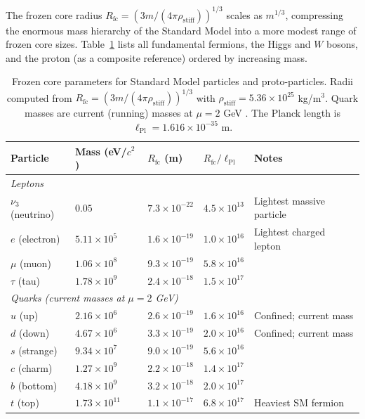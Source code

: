 \documentclass[11pt,a4paper]{article}
\newcommand{\lPl}{\ensuremath{\ell_{\mathrm{Pl}}}}
\newcommand{\rhostiff}{\ensuremath{\rho_{\mathrm{stiff}}}}
\newcommand{\Rfc}{\ensuremath{R_{\mathrm{fc}}}}
\theoremstyle{definition}
\theoremstyle{remark}
\begin{document}
The frozen core radius $\Rfc = (3m/(4\pi\rhostiff))^{1/3}$ scales as $m^{1/3}$, compressing the enormous mass hierarchy of the Standard Model into a more modest range of frozen core sizes. Table~\ref{tab:frozen_cores} lists all fundamental fermions, the Higgs and $W$ bosons, and the proton (as a composite reference) ordered by increasing mass.

\begin{table}[H]
\centering
\caption{Frozen core parameters for Standard Model particles and proto-particles. Radii computed from $\Rfc = (3m/(4\pi\rhostiff))^{1/3}$ with $\rhostiff = 5.36 \times 10^{25}$ kg/m$^3$. Quark masses are current (running) masses at $\mu = 2$ GeV \cite{PDG2024}. The Planck length is $\lPl = 1.616 \times 10^{-35}$ m.}
\label{tab:frozen_cores}
\vspace{0.5em}
\begin{tabular}{lllll}
\toprule
\textbf{Particle} & \textbf{Mass (eV/$c^2$)} & \textbf{$\Rfc$ (m)} & \textbf{$\Rfc/\lPl$} & \textbf{Notes} \\
\midrule
\multicolumn{5}{l}{\textit{Leptons}} \\
$\nu_3$ (neutrino) & $0.05$ & $7.3 \times 10^{-22}$ & $4.5 \times 10^{13}$ & Lightest massive particle \\
$e$ (electron) & $5.11 \times 10^5$ & $1.6 \times 10^{-19}$ & $1.0 \times 10^{16}$ & Lightest charged lepton \\
$\mu$ (muon) & $1.06 \times 10^8$ & $9.3 \times 10^{-19}$ & $5.8 \times 10^{16}$ & \\
$\tau$ (tau) & $1.78 \times 10^9$ & $2.4 \times 10^{-18}$ & $1.5 \times 10^{17}$ & \\
\midrule
\multicolumn{5}{l}{\textit{Quarks (current masses at $\mu = 2$ GeV)}} \\
$u$ (up) & $2.16 \times 10^6$ & $2.6 \times 10^{-19}$ & $1.6 \times 10^{16}$ & Confined; current mass \\
$d$ (down) & $4.67 \times 10^6$ & $3.3 \times 10^{-19}$ & $2.0 \times 10^{16}$ & Confined; current mass \\
$s$ (strange) & $9.34 \times 10^7$ & $9.0 \times 10^{-19}$ & $5.6 \times 10^{16}$ & \\
$c$ (charm) & $1.27 \times 10^9$ & $2.2 \times 10^{-18}$ & $1.4 \times 10^{17}$ & \\
$b$ (bottom) & $4.18 \times 10^9$ & $3.2 \times 10^{-18}$ & $2.0 \times 10^{17}$ & \\
$t$ (top) & $1.73 \times 10^{11}$ & $1.1 \times 10^{-17}$ & $6.8 \times 10^{17}$ & Heaviest SM fermion \\

\end{tabular}
\end{table}
\end{document}
